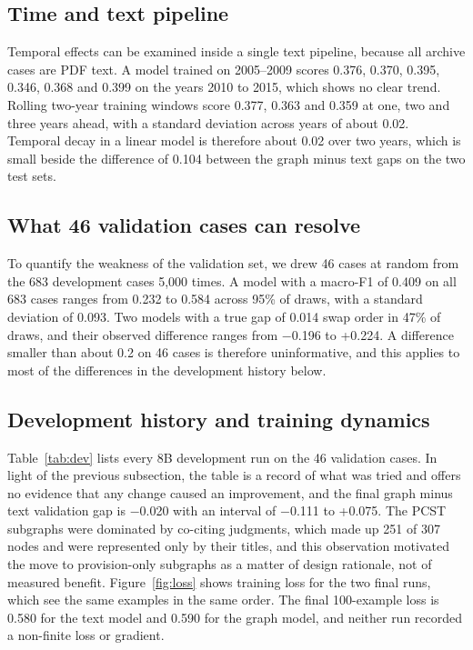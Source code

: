 \documentclass[11pt,a4paper]{article}
\begin{document}
\subsection{Time and text pipeline}\label{sec:res-time}
Temporal effects can be examined inside a single text pipeline, because all archive cases are PDF text. A model trained on 2005--2009 scores 0.376, 0.370, 0.395, 0.346, 0.368 and 0.399 on the years 2010 to 2015, which shows no clear trend. Rolling two-year training windows score 0.377, 0.363 and 0.359 at one, two and three years ahead, with a standard deviation across years of about 0.02. Temporal decay in a linear model is therefore about 0.02 over two years, which is small beside the difference of 0.104 between the graph minus text gaps on the two test sets.

\subsection{What 46 validation cases can resolve}\label{sec:res-valsize}
To quantify the weakness of the validation set, we drew 46 cases at random from the 683 development cases 5,000 times. A model with a macro-F1 of 0.409 on all 683 cases ranges from 0.232 to 0.584 across 95\% of draws, with a standard deviation of 0.093. Two models with a true gap of 0.014 swap order in 47\% of draws, and their observed difference ranges from $-$0.196 to +0.224. A difference smaller than about 0.2 on 46 cases is therefore uninformative, and this applies to most of the differences in the development history below.

\subsection{Development history and training dynamics}
Table~\ref{tab:dev} lists every 8B development run on the 46 validation cases. In light of the previous subsection, the table is a record of what was tried and offers no evidence that any change caused an improvement, and the final graph minus text validation gap is $-$0.020 with an interval of $-$0.111 to +0.075. The PCST subgraphs were dominated by co-citing judgments, which made up 251 of 307 nodes and were represented only by their titles, and this observation motivated the move to provision-only subgraphs as a matter of design rationale, not of measured benefit. Figure~\ref{fig:loss} shows training loss for the two final runs, which see the same examples in the same order. The final 100-example loss is 0.580 for the text model and 0.590 for the graph model, and neither run recorded a non-finite loss or gradient.
\end{document}
